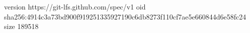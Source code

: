 version https://git-lfs.github.com/spec/v1
oid sha256:4914c3a73bd900f919251335927190c6db8273f110cf7ae5e660844d6e58fc24
size 189518

